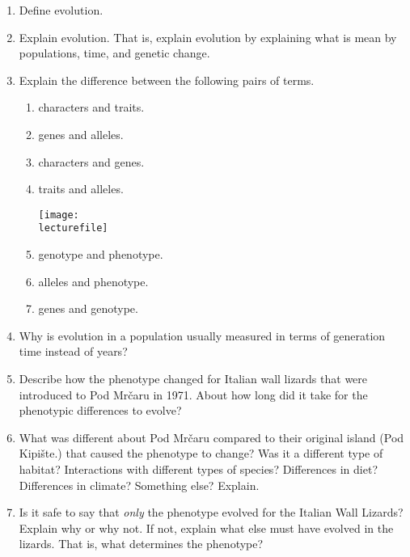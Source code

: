 \documentclass[letterpaper]{tufte-handout}
\newcommand\lecturefile{163_lecture01_fullsize}
\begin{document}
\begin{enumerate}

	\item Define evolution. 
	
	\item Explain evolution. That is, explain evolution by explaining what is mean by populations, time, and genetic change. 
	
	\item Explain the difference between the following pairs of terms.
	
	\begin{enumerate}
		\item characters and traits.
		
		\item genes and alleles.
		
		\item characters and genes.
		
		\item traits and alleles.
		
	\begin{marginfigure}
		\texttt{[image: \\lecturefile]}
	\end{marginfigure}
	
		\item genotype and phenotype.
		
		\item alleles and phenotype.
		
		\item genes and genotype.
		
	\end{enumerate}

	\item Why is evolution in a population usually measured in terms of generation time instead of years?

	\item Describe how the phenotype changed for Italian wall lizards that were introduced to Pod Mr\v{c}aru in 1971. About how long did it take for the phenotypic differences to evolve? 
	
	\item What was different about Pod Mr\v{c}aru compared to their original island (Pod Kipi\v{s}te.) that caused the phenotype to change? Was it a different type of habitat? Interactions with different types of species? Differences in diet? Differences in climate? Something else? Explain.
	

	\item Is it safe to say that \emph{only} the phenotype evolved for the Italian Wall Lizards?  Explain why or why not. If not, explain what else must have evolved in the lizards. That is, what determines the phenotype? 
	
\end{enumerate}
\end{document}
